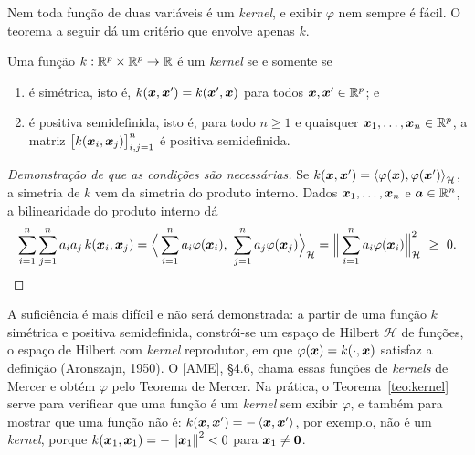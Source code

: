 \documentclass[11pt,a4paper]{article}
\begin{document}
Nem toda função de duas variáveis é um \emph{kernel}, e exibir $\varphi$ nem sempre é
fácil. O teorema a seguir dá um critério que envolve apenas $k$.

\begin{teorema}\label{teo:kernel}
Uma função $k:\mathbb{R}^p\times\mathbb{R}^p\to\mathbb{R}$ é um \emph{kernel} se e somente se
\begin{enumerate}[label=(\roman*),leftmargin=1.4cm]
  \item é simétrica, isto é, $k(\bm{x},\bm{x}')=k(\bm{x}',\bm{x})$ para todos $\bm{x},\bm{x}'\in\mathbb{R}^p$; e
  \item é positiva semidefinida, isto é, para todo $n\ge1$ e quaisquer
        $\bm{x}_1,\dots,\bm{x}_n\in\mathbb{R}^p$, a matriz $\big[k(\bm{x}_i,\bm{x}_j)\big]_{i,j=1}^n$ é
        positiva semidefinida.
\end{enumerate}
\end{teorema}
\begin{proof}[Demonstração de que as condições são necessárias]
Se $k(\bm{x},\bm{x}')=\left\langle \varphi(\bm{x}), \varphi(\bm{x}') \right\rangle_{\mathcal H}$, a simetria de $k$ vem da
simetria do produto interno. Dados $\bm{x}_1,\dots,\bm{x}_n$ e $\bm a\in\mathbb{R}^n$, a
bilinearidade do produto interno dá
\[
  \sum_{i=1}^n\sum_{j=1}^na_ia_j\,k(\x_i,\x_j)
  =\Big\langle\sum_{i=1}^na_i\varphi(\x_i),\ \sum_{j=1}^na_j\varphi(\x_j)\Big\rangle_{\mathcal H}
  =\Big\|\sum_{i=1}^na_i\varphi(\x_i)\Big\|_{\mathcal H}^2\ \ge\ 0. \qedhere
\]
\end{proof}

A suficiência é mais difícil e não será demonstrada: a partir de uma função $k$
simétrica e positiva semidefinida, constrói-se um espaço de Hilbert $\mathcal H$ de
funções, o espaço de Hilbert com \emph{kernel} reprodutor, em que
$\varphi(\bm{x})=k(\cdot,\bm{x})$ satisfaz a definição (Aronszajn, 1950). O [AME], §4.6, chama
essas funções de \emph{kernels} de Mercer e obtém $\varphi$ pelo Teorema de Mercer. Na
prática, o Teorema~\ref{teo:kernel} serve para verificar que uma função é um
\emph{kernel} sem exibir $\varphi$, e também para mostrar que uma função não é:
$k(\bm{x},\bm{x}')=-\left\langle \bm{x}, \bm{x}' \right\rangle$, por exemplo, não é um \emph{kernel}, porque
$k(\bm{x}_1,\bm{x}_1)=-\left\lVert \bm{x}_1 \right\rVert^2<0$ para $\bm{x}_1\ne\bm 0$.
\end{document}
